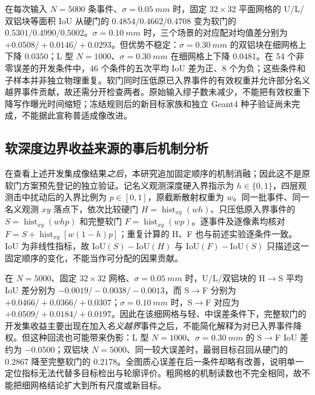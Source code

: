\documentclass[UTF8,fontset=none,zihao=-4,a4paper]{ctexart}
\begin{document}
在每次输入 $N=5000$ 条事件、$\sigma=\SI{0.05}{mm}$ 时，固定 $32\times32$ 平面网格的 U/L/双铝块等面积 IoU 从硬门的 $0.4854/0.4662/0.4708$ 变为软门的 $0.5301/0.4990/0.5002$。$\sigma=\SI{0.10}{mm}$ 时，三个场景的对应配对均值差分别为 $+0.0508/+0.0146/+0.0293$。但优势不稳定：$\sigma=\SI{0.30}{mm}$ 的双铝块在细网格上下降 $0.0350$；L 型 $N=1000$、$\sigma=\SI{0.30}{mm}$ 在细网格上下降 $0.0481$。在 54 个非零误差的开发条件中，46 个条件的五次平均 IoU 差为正、8 个为负；这些条件和子样本并非独立物理重复。软门同时压低原已入界事件的有效权重并允许部分名义越界事件贡献，故还需分开检查两者。原始输入缪子数未减少，不能把有效权重下降写作曝光时间缩短；冻结规则后的新目标家族和独立 Geant4 种子验证尚未完成，不能据此宣称普适成像改进。

\subsection{软深度边界收益来源的事后机制分析}
在查看上述开发集成像结果\emph{之后}，本研究追加固定顺序的机制消融；因此这不是原软门方案预先登记的独立验证。记名义观测深度硬入界指示为 $h\in\{0,1\}$，四层观测击中扰动后的入界比例为 $p\in[0,1]$，原截断散射权重为 $w$。同一批事件、同一名义观测 $xy$ 落点下，依次比较硬门 $H=\operatorname{hist}_{xy}(wh)$、只压低原入界事件的 $S=\operatorname{hist}_{xy}(whp)$ 和完整软门 $F=\operatorname{hist}_{xy}(wp)$。逐事件及逐像素均核对 $F=S+\operatorname{hist}_{xy}[w(1-h)p]$；重复计算的 H、F 也与前述实验逐条件一致。IoU 为非线性指标，故 $\mathrm{IoU}(S)-\mathrm{IoU}(H)$ 与 $\mathrm{IoU}(F)-\mathrm{IoU}(S)$ 只描述这一固定顺序的变化，不能当作可分配的因果贡献。

在 $N=5000$、固定 $32\times32$ 网格、$\sigma=\SI{0.05}{mm}$ 时，U/L/双铝块的 H$\to$S 平均 IoU 差分别为 $-0.0019/-0.0038/-0.0013$，而 S$\to$F 分别为 $+0.0466/+0.0366/+0.0307$；$\sigma=\SI{0.10}{mm}$ 时，S$\to$F 对应为 $+0.0509/+0.0184/+0.0197$。因此在该细网格与轻、中误差条件下，完整软门的开发集收益主要出现在加入\emph{名义越界}事件之后，不能简化解释为对已入界事件降权。但这种回流也可能带来伪影：L 型 $N=1000$、$\sigma=\SI{0.30}{mm}$ 的 S$\to$F IoU 差约为 $-0.0500$；双铝块 $N=5000$、同一较大误差时，最弱目标召回从硬门的 $0.2867$ 降至完整软门的 $0.2178$。全图质心误差在后一条件却略有改善，说明单一定位指标无法代替多目标检出与轮廓评价。粗网格的机制读数也不完全相同，故不能把细网格结论扩大到所有尺度或新目标。
\end{document}
